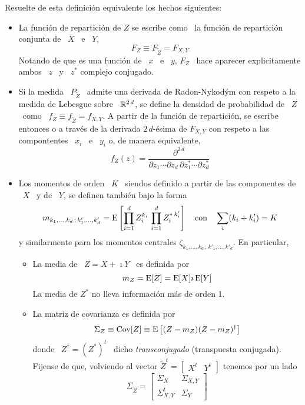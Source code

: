 Resuelte de esta definici\'on equivalente los hechos siguientes:
%
\begin{itemize}
\item La  funci\'on de repartici\'on  de $Z$ se  escribe como \ la  funci\'on de
  repartici\'on conjunta de \ $X$ \ e \ $Y$,
  \[
  F_Z \equiv F_{\widetilde{Z}} = F_{X,Y}
  \]
  Notando de  que es una  funci\'on de \  $x$ \ e \  $y$, $F_Z$ \  hace aparecer
  explicitamente ambos \ $z$ \ y \ $z^*$ complejo conjugado.
%
\item   Si  la   medida  \   $P_{\widetilde{Z}}$  \   admite  una   derivada  de
  Radon-Nykod\'ym con respeto a la medida  de Lebesgue sobre \ $\mathbb{R}^{2 \, d}$,
  se  define  la  densidad de  probabilidad  de  \  $Z$  \  como \  $f_Z  \equiv
  f_{\widetilde{Z}} =  f_{X,Y}$. A partir  de la funci\'on de  repartici\'on, se
  escribe entonces o a trav\'es de la derivada $2 \, d$-\'esima de $F_{X,Y}$ con
  respeto a las compontentes \ $x_i$ \ e \ $y_i$ o, de manera equivalente,
  \[
  f_Z(z) = \frac{\partial^{2 \, d}}{\partial z_1 \cdots \partial z_d \, \partial
    z_1^* \cdots \partial z_d^*}
  \]
%
\item Los momentos de orden \ $K$ \ siendos definido a partir de las componentes
  de \ $X$ \ y de \ $Y$, se definen tambi\'en bajo la forma
  \[
  m_{k_1 , \ldots , k_d \, ; \, k'_1 , \ldots , k'_d} = \operatorname{E}\left[ \prod_{i=1}^d
    Z_i^{k_i}  \,  \prod_{i=1}^d   Z_i^{* \: k'_i}  \right]  \quad
  \mbox{con} \quad \sum_i (k_i + k'_i) = K
  \]
  y similarmente para los momentos centrales  $\zeta_{k_1 , \ldots , k_d \, ; \,
    k'_1 , \ldots , k'_d}$.  En particular,
  \begin{itemize}
  \item La media de \ $Z = X + \imath Y$ \ es definida por
    \[
    m_Z = \operatorname{E}[Z] = \operatorname{E}[X] \imath \operatorname{E}[Y]
    \]
    La media de $Z^*$ no lleva informaci\'on m\'as de orden 1.
  \item La matriz de covarianza es definida por
    \[
    \Sigma_Z \equiv \operatorname{Cov}[Z] \equiv \operatorname{E}\left[ (Z-m_Z) (Z-m_Z)^\dag \right]
    \]
    donde  \  $Z^\dag  =  (Z^*)^t$  \ dicho  {\em  transconjugado}  (transpuesta
    conjugada).    Fijense  de   que,  volviendo   al   vector  $\widetilde{Z}^t
    = \begin{bmatrix} X^t & Y^t \end{bmatrix}$ tenemos por un lado
    \[
    \Sigma_{\widetilde{Z}}  = \begin{bmatrix}
      \Sigma_X & \Sigma_{X,Y}\\ \Sigma_{X,Y}^t & \Sigma_Y\end{bmatrix}
\]
\end{itemize}
\end{itemize}
